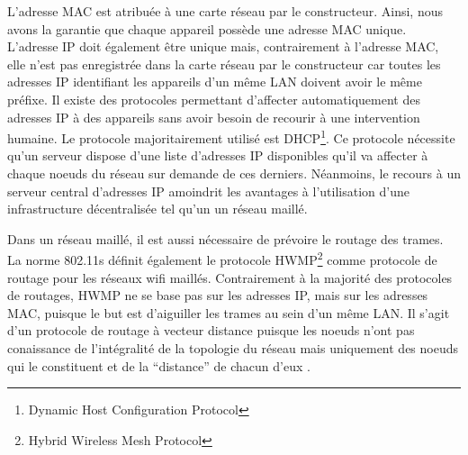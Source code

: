 L'adresse MAC est atribuée à une carte réseau par le constructeur. Ainsi, nous avons la garantie que chaque appareil possède une
adresse MAC unique. L'adresse IP doit également être unique mais, contrairement à l'adresse MAC, elle n'est pas enregistrée dans
la carte réseau par le constructeur car toutes les adresses IP identifiant les appareils d'un même LAN doivent avoir le même 
préfixe. Il existe des protocoles permettant d'affecter automatiquement des adresses IP à des appareils sans avoir besoin de
recourir à une intervention humaine. Le protocole majoritairement utilisé est DHCP\footnote{Dynamic Host Configuration 
Protocol}. Ce protocole nécessite qu'un serveur dispose d'une liste d'adresses IP disponibles qu'il va affecter à chaque noeuds
du réseau sur demande de ces derniers\cite{DHCP}. Néanmoins, le recours à un serveur central d'adresses IP amoindrit les 
avantages à l'utilisation d'une infrastructure décentralisée tel qu'un un réseau maillé.

Dans un réseau maillé, il est aussi nécessaire de prévoire le routage des trames. La norme 802.11s définit également le protocole
HWMP\footnote{Hybrid Wireless Mesh Protocol} comme protocole de routage pour les réseaux wifi maillés. Contrairement à la majorité 
des protocoles de routages, HWMP ne se base pas sur les adresses IP, mais sur les adresses MAC, puisque le but est d'aiguiller
les trames au sein d'un même LAN. Il s'agit d'un protocole de routage à vecteur distance puisque les noeuds n'ont pas conaissance
de l'intégralité de la topologie du réseau mais uniquement des noeuds qui le constituent et de la ``distance'' de chacun d'eux
\cite{MNroute}.
